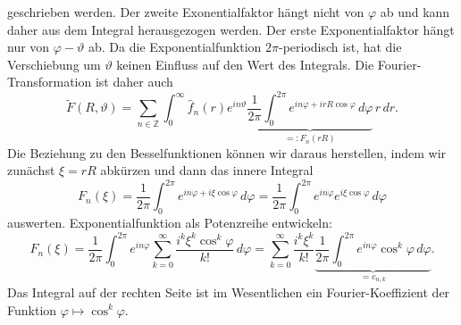geschrieben werden.
Der zweite Exonentialfaktor hängt nicht von $\varphi$ ab und kann daher
aus dem Integral herausgezogen werden.
Der erste Exponentialfaktor hängt nur von $\varphi-\vartheta$ ab.
Da die Exponentialfunktion $2\pi$-periodisch ist, hat die Verschiebung
um $\vartheta$ keinen Einfluss auf den Wert des Integrals.
Die Fourier-Transformation ist daher auch
\[
\tilde{F}(R,\vartheta)
=
\sum_{n\in\mathbb{Z}}
\int_0^\infty
\hat{f}_n(r)
e^{in\vartheta}
\underbrace{
\frac{1}{2\pi}
\int_0^{2\pi}
e^{in\varphi+irR\cos\varphi}
\,d\varphi
}_{\displaystyle =:F_n(rR)}
\,
r\,dr.
\]
Die Beziehung zu den Besselfunktionen können wir daraus herstellen,
indem wir zunächst $\xi = rR$ abkürzen und dann das innere Integral
\begin{equation}
F_n(\xi)
=
\frac{1}{2\pi}
\int_{0}^{2\pi}
e^{in\varphi+i\xi\cos\varphi}
\,d\varphi
=
\frac{1}{2\pi}
\int_{0}^{2\pi}
e^{in\varphi}e^{i\xi\cos\varphi}
\,d\varphi
\label{buch:fourier:eqn:Fncosphi}
\end{equation}
auswerten.
Exponentialfunktion als Potenzreihe entwickeln:
\[
F_n(\xi)
=
\frac{1}{2\pi}
\int_0^{2\pi}
e^{in\varphi}
\sum_{k=0}^\infty
\frac{
i^k\xi^k \cos^k\varphi
}{k!}
\,d\varphi
=
\sum_{k=0}^\infty
\frac{i^k\xi^k}{k!}
\underbrace{
\frac{1}{2\pi}
\int_0^{2\pi}
e^{in\varphi}
\cos^k\varphi
\,d\varphi}_{\displaystyle =c_{n,k}}.
\]
Das Integral auf der rechten Seite ist im Wesentlichen ein
Fourier-Koeffizient der Funktion $\varphi\mapsto \cos^k\varphi$.


